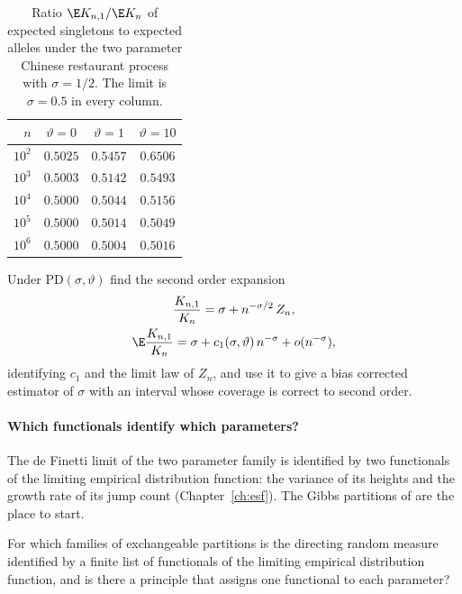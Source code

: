 \begin{table}[ht]
\centering
\small
\caption{Ratio $\E K_{n,1}/\E K_n$ of expected singletons to expected alleles under the two
parameter Chinese restaurant process with $\sigma=1/2$. The limit is $\sigma=0.5$ in every
column.}\label{future:tab:singleton}
\begin{tabular}{rccc}
\toprule
$n$ & $\vartheta=0$ & $\vartheta=1$ & $\vartheta=10$ \\
\midrule
$10^2$ & $0.5025$ & $0.5457$ & $0.6506$ \\
$10^3$ & $0.5003$ & $0.5142$ & $0.5493$ \\
$10^4$ & $0.5000$ & $0.5044$ & $0.5156$ \\
$10^5$ & $0.5000$ & $0.5014$ & $0.5049$ \\
$10^6$ & $0.5000$ & $0.5004$ & $0.5016$ \\
\bottomrule
\end{tabular}
\end{table}

\begin{question}\label{future:q:second}
Under $\mathrm{PD}(\sigma,\vartheta)$ find the second order expansion
\begin{equation*}
\begin{gathered}\frac{K_{n,1}}{K_n}=\sigma+n^{-\sigma/2}\,Z_n,\\ \E\frac{K_{n,1}}{K_n}=\sigma+c_1(\sigma,\vartheta)\,n^{-\sigma}+o(n^{-\sigma}),\end{gathered}
\end{equation*}
identifying $c_1$ and the limit law of $Z_n$, and use it to give a bias corrected estimator of
$\sigma$ with an interval whose coverage is correct to second order.
\end{question}

\paragraph{Which functionals identify which parameters?} The de Finetti limit of the two parameter
family is identified by two functionals of the limiting empirical distribution function: the
variance of its heights and the growth rate of its jump count (Chapter~\ref{ch:esf}). The Gibbs
partitions of \citet{future:gnedin2006} are the place to start.

\begin{question}\label{future:q:ident}
For which families of exchangeable partitions is the directing random measure identified by a
finite list of functionals of the limiting empirical distribution function, and is there a
principle that assigns one functional to each parameter?
\end{question}

